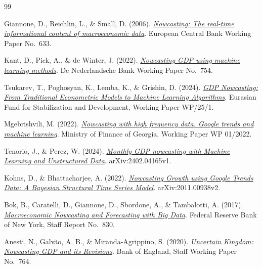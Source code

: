 \documentclass[12pt,a4paper]{report}
\begin{document}
\begin{thebibliography}{99}

Giannone, D., Reichlin, L., \& Small, D. (2006).
\href{https://www.ecb.europa.eu/pub/pdf/scpwps/ecbwp633.pdf}{\textit{Nowcasting: The real-time informational content of macroeconomic data}}.
European Central Bank Working Paper No.\ 633.

Kant, D., Pick, A., \& de Winter, J. (2022).
\href{https://www.dnb.nl/media/kq4pe4cr/working_paper_no_754.pdf}{\textit{Nowcasting GDP using machine learning methods}}.
De Nederlandsche Bank Working Paper No.\ 754.

Tsukarev, T., Poghosyan, K., Lemba, K., \& Grishin, D. (2024).
\href{https://efsd.org/upload/iblock/0f4/hwg0io77bdcni8o7z0qmqjlpu7zagtpo/GDP-NOWCASTING-FROM-TRADITIONAL-ECONOMETRIC-MODELS-TO-MACHINE-LEARNING-ALGORITHMS.pdf}{\textit{GDP Nowcasting: From Traditional Econometric Models to Machine Learning Algorithms}}.
Eurasian Fund for Stabilization and Development, Working Paper WP/25/1.

Mgebrishvili, M. (2022).
\href{https://drive.google.com/file/d/118GZO60e9TBU52rk-vnPM0KlXjtRH4S2/view?usp=sharing}{\textit{Nowcasting with high frequency data, Google trends and machine learning}}.
Ministry of Finance of Georgia, Working Paper WP 01/2022.

Tenorio, J., \& Perez, W. (2024).
\href{https://drive.google.com/file/d/1tIbCTI5vBiTK9OfBZ8C-3nT4Bnhuco1d/view?usp=sharing}{\textit{Monthly GDP nowcasting with Machine Learning and Unstructured Data}}.
arXiv:2402.04165v1.

Kohns, D., \& Bhattacharjee, A. (2022).
\href{https://arxiv.org/abs/2011.00938}{\textit{Nowcasting Growth using Google Trends Data: A Bayesian Structural Time Series Model}}.
arXiv:2011.00938v2.

Bok, B., Caratelli, D., Giannone, D., Sbordone, A., \& Tambalotti, A. (2017).
\href{https://www.newyorkfed.org/medialibrary/media/research/staff_reports/sr830.pdf}{\textit{Macroeconomic Nowcasting and Forecasting with Big Data}}.
Federal Reserve Bank of New York, Staff Report No.\ 830.

Anesti, N., Galv\~{a}o, A. B., \& Miranda-Agrippino, S. (2020).
\href{https://www.bankofengland.co.uk/-/media/boe/files/working-paper/2018/uncertain-kingdom-nowcasting-gdp-and-its-revisions.pdf}{\textit{Uncertain Kingdom: Nowcasting GDP and its Revisions}}.
Bank of England, Staff Working Paper No.\ 764.

\end{thebibliography}
\end{document}
